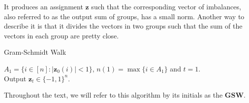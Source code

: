 \documentclass[12pt]{article}
\begin{document}
It produces an assignment $\textbf{z}$ such that the corresponding vector of imbalances, also referred to as the output sum of groups, has a small norm. Another way to describe it is that it divides the vectors in two groups such that the sum of the vectors in each group are pretty close.

\begin{algorithm}[H]\label{walk}
{\fontsize{10}{12}
\caption{Gram-Schmidt Walk \cite{blues}}
   $A_1=\{i\in[n]:|\textbf{z}_0(i)|<1\}$, $n(1) = \max \{i \in A_1\}$ and $t=1$.\\
    Output $\textbf{z}_t\in\{-1,1\}^n$.
    }%
    \end{algorithm}
Throughout the text, we will refer to this algorithm by its initials as the \textbf{GSW}.%
\end{document}
